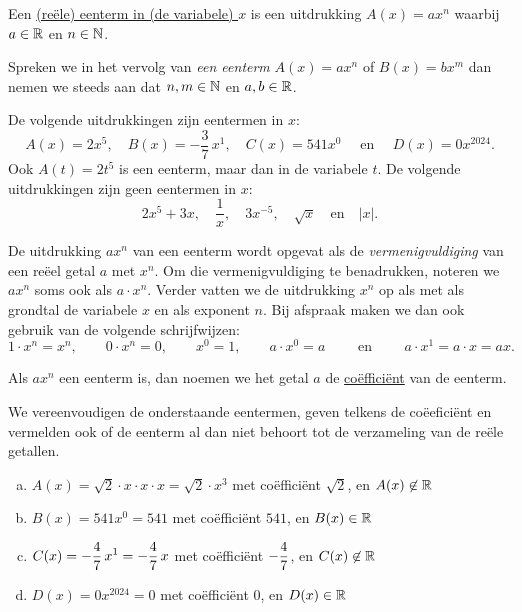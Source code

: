 \documentclass{ximera}
\begin{document}
\begin{definitie}
Een \underline{(re\"ele) eenterm in (de variabele) $x$} is een uitdrukking $A(x) = ax^n$ waarbij $a \in \mathbb{R}$ en $n \in \mathbb{N}$. 
\end{definitie}

Spreken we in het vervolg van {\em een eenterm} $A(x) = ax^n$ of $B(x) = bx^m$ dan nemen we steeds aan dat $n,m\in \mathbb{N}$ en $a,b\in \mathbb{R}$.

\begin{voorbeeld}
De volgende uitdrukkingen zijn eentermen in $x$:
\[
A(x) = 2x^5, \quad B(x) = -\frac{3}{7}\,x^1, \quad C(x) = 541x^0 \quad \text{ en } \quad D(x) = 0x^{2024}.
\]
Ook $A(t) = 2t^5$ is een eenterm, maar dan in de variabele $t$. De volgende uitdrukkingen zijn geen eentermen in $x$:
\[
2x^5+3x, \quad \frac{1}{x}, \quad 3x^{-5}, \quad \sqrt{x} \quad \text{en} \quad \left|x\right|.
\] 
\end{voorbeeld}

De uitdrukking $ax^n$ van een eenterm wordt opgevat als de {\em vermenigvuldiging} van een re\"eel getal $a$ met $x^n$. Om die vermenigvuldiging te benadrukken, noteren we $ax^n$ soms ook als $a \cdot x^n$. Verder vatten we de uitdrukking $x^n$ op als  met als grondtal de variabele $x$ en als exponent $n$. Bij afspraak maken we dan ook gebruik van de volgende schrijfwijzen:
\[
1\cdot x^n = x^n, \qquad
0\cdot x^n = 0, \qquad  
x^0 = 1, \qquad 
a\cdot x^0 = a \qquad \text{ en } \qquad 
a\cdot x^1 = a \cdot x = ax.
\]

Als $ax^n$ een eenterm is, dan noemen we het getal $a$ de \underline{co\"effici\"ent} van de eenterm.

\begin{voorbeeld}
We vereenvoudigen de onderstaande eentermen, geven telkens de co\"eefici\"ent en vermelden ook of de eenterm al dan niet behoort tot de verzameling van de re\"ele getallen.
\begin{enumerate}[(a)]
\item
$A(x) = \sqrt{2}\cdot x \cdot x \cdot x = \sqrt{2}\cdot x^3$ met co\"effici\"ent $\sqrt{2}$, en $A(x) \not\in \mathbb{R}$
\item
$B(x) = 541x^0 = 541$ met co\"effici\"ent $541$, en $B(x) \in \mathbb{R}$ 
\item
$\displaystyle C(x) = -\frac{4}{7}\,x^1 = -\frac{4}{7}\,x$ met co\"effici\"ent $\displaystyle -\frac{4}{7}$, en $C(x) \not\in \mathbb{R}$
\item
$D(x) = 0 x^{2024} = 0$ met co\"effici\"ent $0$, en $D(x) \in \mathbb{R}$ 
\end{enumerate}
\end{voorbeeld}
\end{document}

